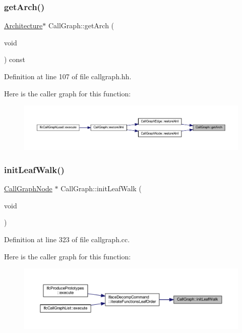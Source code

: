 \subsubsection{\texorpdfstring{getArch()}{getArch()}}
{\footnotesize\ttfamily \mbox{\hyperlink{class_architecture}{Architecture}}$\ast$ Call\+Graph\+::get\+Arch (\begin{DoxyParamCaption}\item[{void}]{ }\end{DoxyParamCaption}) const\hspace{0.3cm}{\ttfamily [inline]}}



Definition at line 107 of file callgraph.\+hh.

Here is the caller graph for this function\+:
\nopagebreak
\begin{figure}[H]
\begin{center}
\leavevmode
\includegraphics[width=350pt]{class_call_graph_a8c6cd0bdd5cfc3e3e5b34890820de311_icgraph}
\end{center}
\end{figure}
\mbox{\label{class_call_graph_a226293ff8bec627b62cf0759fa5a4352}} 
\subsubsection{\texorpdfstring{initLeafWalk()}{initLeafWalk()}}
{\footnotesize\ttfamily \mbox{\hyperlink{class_call_graph_node}{Call\+Graph\+Node}} $\ast$ Call\+Graph\+::init\+Leaf\+Walk (\begin{DoxyParamCaption}\item[{void}]{ }\end{DoxyParamCaption})}



Definition at line 323 of file callgraph.\+cc.

Here is the caller graph for this function\+:
\nopagebreak
\begin{figure}[H]
\begin{center}
\leavevmode
\includegraphics[width=350pt]{class_call_graph_a226293ff8bec627b62cf0759fa5a4352_icgraph}
\end{center}
\end{figure}
\mbox{\label{class_call_graph_a466944999f6f0f2b68cbfc90043ecc6c}} 
